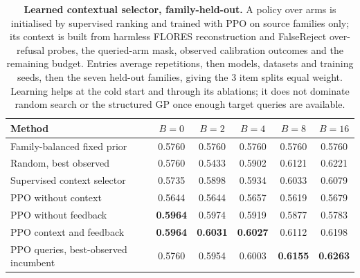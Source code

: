 \begin{table}[t]
\centering
\small
\caption{\textbf{Learned contextual selector, family-held-out.} A policy over arms is initialised by
supervised ranking and trained with PPO on source families only; its context is built from harmless
FLORES reconstruction and FalseReject over-refusal probes, the queried-arm mask, observed calibration
outcomes and the remaining budget. Entries average repetitions, then models, datasets and training
seeds, then the seven held-out families, giving the 3 item splits equal weight. Learning helps at the
cold start and through its ablations; it does not dominate random search or the structured GP once
enough target queries are available.}
\label{tab:confirm_selector}
\begin{tabular}{lccccc}
\toprule
Method & $B{=}0$ & $B{=}2$ & $B{=}4$ & $B{=}8$ & $B{=}16$ \\
\midrule
Family-balanced fixed prior & 0.5760 & 0.5760 & 0.5760 & 0.5760 & 0.5760 \\
Random, best observed & 0.5760 & 0.5433 & 0.5902 & 0.6121 & 0.6221 \\
Supervised context selector & 0.5735 & 0.5898 & 0.5934 & 0.6033 & 0.6079 \\
PPO without context & 0.5644 & 0.5644 & 0.5657 & 0.5619 & 0.5679 \\
PPO without feedback & \textbf{0.5964} & 0.5974 & 0.5919 & 0.5877 & 0.5783 \\
PPO context and feedback & \textbf{0.5964} & \textbf{0.6031} & \textbf{0.6027} & 0.6112 & 0.6198 \\
PPO queries, best-observed incumbent & 0.5760 & 0.5954 & 0.6003 & \textbf{0.6155} & \textbf{0.6263} \\
\bottomrule
\end{tabular}
\end{table}
